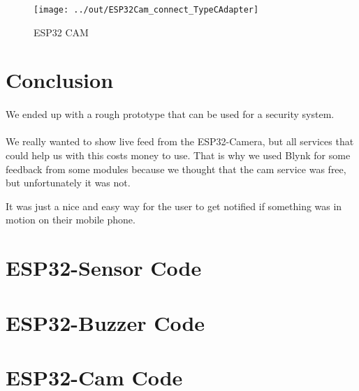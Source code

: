 \documentclass[a4paper, 12pt]{article}        %
\begin{document}
    \begin{figure}[h]
        \caption{ESP32 CAM}\label{fig:figure4}
        \centering
        \texttt{[image: ../out/ESP32Cam\_connect\_TypeCAdapter]}
    \end{figure}

    \pagebreak
    \section{Conclusion}\label{sec:conclusion}

    \paragraph{}
    We ended up with a rough prototype that can be used for a security system.

    \paragraph{}
    We really wanted to show live feed from the ESP32-Camera, but all services that could help us with this costs money to use.
    That is why we used Blynk for some feedback from some modules because we thought that the cam service was free,
    but unfortunately it was not.

    \paragragh{}
    It was just a nice and easy way for the user to get notified if something
    was in motion on their mobile phone.

    \pagebreak
    \appendix

    \section{ESP32-Sensor Code}
    
    \pagebreak

    \section{ESP32-Buzzer Code}
    
    \pagebreak

    \section{ESP32-Cam Code}
    
    \pagebreak
\end{document}
